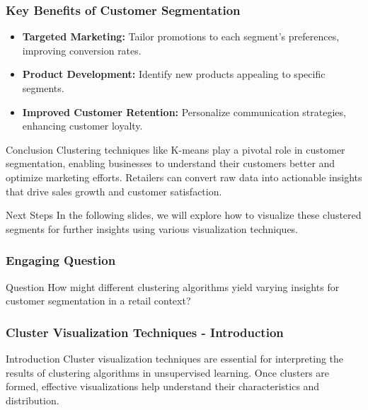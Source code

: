\documentclass[aspectratio=169]{beamer}
\begin{document}
\begin{frame}[fragile]
    \frametitle{Key Benefits of Customer Segmentation}
    
    \begin{itemize}
        \item \textbf{Targeted Marketing:} Tailor promotions to each segment's preferences, improving conversion rates.
        \item \textbf{Product Development:} Identify new products appealing to specific segments.
        \item \textbf{Improved Customer Retention:} Personalize communication strategies, enhancing customer loyalty.
    \end{itemize}

    \begin{block}{Conclusion}
        Clustering techniques like K-means play a pivotal role in customer segmentation, enabling businesses to understand their customers better and optimize marketing efforts. Retailers can convert raw data into actionable insights that drive sales growth and customer satisfaction.
    \end{block}

    \begin{block}{Next Steps}
        In the following slides, we will explore how to visualize these clustered segments for further insights using various visualization techniques.
    \end{block}
\end{frame}

\begin{frame}[fragile]
    \frametitle{Engaging Question}
    
    \begin{block}{Question}
        How might different clustering algorithms yield varying insights for customer segmentation in a retail context?
    \end{block}
\end{frame}

\begin{frame}[fragile]
    \frametitle{Cluster Visualization Techniques - Introduction}
    \begin{block}{Introduction}
        Cluster visualization techniques are essential for interpreting the results of clustering algorithms in unsupervised learning. Once clusters are formed, effective visualizations help understand their characteristics and distribution.
    \end{block}
\end{frame}
\end{document}
